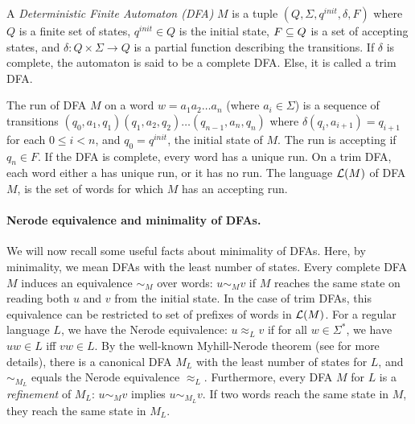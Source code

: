 \begin{definition} \label{def:dfa}
A \emph{Deterministic Finite Automaton (DFA)} $M$ is a tuple
$(Q, \Sigma, q^{init}, \delta, F)$ where $Q$ is a finite set of
states, $q^{init} \in Q$ is the initial state, $F \subseteq Q$ is a set of
accepting states, and $\delta: Q \times \Sigma \to Q$ is a partial
function describing the transitions. If $\delta$ is complete, the
automaton is said to be a complete DFA. Else, it is called a trim
DFA. 
\end{definition}

The run of DFA $M$ on a word $w = a_1 a_2 \dots a_n$ (where
$a_i \in \Sigma$) is a sequence of transitions
$(q_0, a_1, q_1) (q_1, a_2, q_2) \dots (q_{n-1}, a_n, q_n)$ where $\delta(q_i, a_{i+1}) = q_{i+1}$ for each $0 \le i < n$, and
$q_0 = q^{init}$, the initial state of $M$. The run is accepting if
$q_n \in F$. If the DFA is complete, every word has a unique run. On a
trim DFA, each word either a has unique run, or it has no run. The
language $\mathcal{L}(M)$ of DFA $M$, is the set of words for which $M$ has an
accepting run.

\paragraph*{Nerode equivalence and minimality of DFAs.} 
We will now recall some useful facts about minimality of DFAs. Here,
by minimality, we mean DFAs with the least number of states. Every
complete DFA $M$ induces an equivalence $\sim_M$ over words:
$u \sim_M v$ if $M$ reaches the same state on reading both $u$ and $v$
from the initial state.  In the case of trim DFAs, this equivalence
can be restricted to set of prefixes of words in $\mathcal{L}(M)$. For a
regular language $L$, we have the Nerode equivalence: $u \approx_L v$
if for all $w \in \Sigma^*$, we have $uw \in L$ iff $v w \in L$. By
the well-known Myhill-Nerode theorem (see
\cite{DBLP:books/daglib/0016921} for more details), there is a
canonical DFA $M_L$ with the least number of states for $L$, and
$\sim_{M_L}$ equals the Nerode equivalence $\approx_L$. Furthermore,
every DFA $M$ for $L$ is a \emph{refinement} of $M_L$: $u \sim_M v$
implies $u \sim_{M_L} v$. If two words reach the same state in $M$,
they reach the same state in $M_L$.


